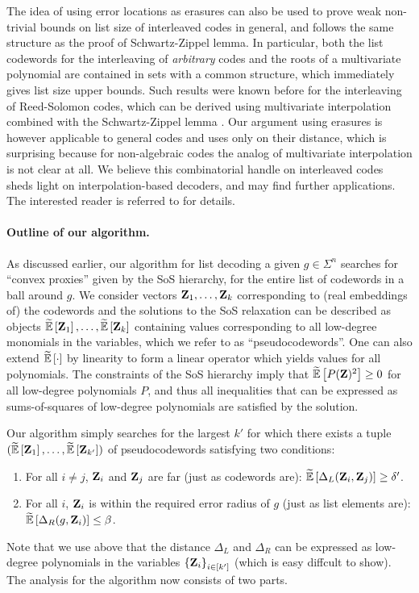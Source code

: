 The idea of using error locations as erasures can also be used to prove weak non-trivial bounds on list size of interleaved codes in general, and follows the same structure as the proof of Schwartz-Zippel lemma. In particular, both the list codewords for the interleaving of \emph{arbitrary} codes and the roots of a multivariate polynomial are contained in sets with a common structure, which immediately gives list size upper bounds. Such results were known before for the interleaving of Reed-Solomon codes, which can be derived using multivariate interpolation combined with the Schwartz-Zippel lemma \cite{CS03, PV05, GX13}. Our argument using erasures is however applicable to general codes and uses only on their distance, which is surprising because for non-algebraic codes the analog of multivariate interpolation is not clear at all. We believe this combinatorial handle on interleaved codes sheds light on interpolation-based decoders, and may find further applications. The interested reader is referred to \cite{Sri24:thesis} for details.

\vspace{-5 pt}
\paragraph{Outline of our algorithm.}
%
As discussed earlier, our algorithm for list decoding a given $g \in \Sigma^n$ searches for ``convex
proxies'' given by the SoS hierarchy, for the entire list of codewords in a ball around $g$.
%
We consider vectors ${ \mathbf{Z} }_1, \ldots, { \mathbf{Z} }_k$ corresponding to (real embeddings of) the codewords
and the solutions to the SoS relaxation can be described as objects $\tildeEx{\zee_1}, \ldots,
\tildeEx{\zee_k}$ containing values corresponding to all low-degree monomials in the variables,
which we refer to as ``pseudocodewords''.
%
One can also extend $\tildeEx{\cdot}$ by linearity to form a linear operator which yields values for
all polynomials. The constraints of the SoS hierarchy imply that $\tildeEx{P(\zee)^2} \geq 0$ for all
low-degree polynomials $P$, and thus all inequalities that can be expressed as sums-of-squares of
low-degree polynomials are satisfied by the solution.

Our algorithm simply searches for the largest $k'$ for which there exists a tuple $(\tildeEx{\zee_1}, \ldots,
\tildeEx{\zee_{k'}})$ of pseudocodewords satisfying two conditions:
%
\begin{enumerate}
\item For all $i \neq j$, ${ \mathbf{Z} }_i$ and ${ \mathbf{Z} }_j$ are far (just as codewords are):
  $\tildeEx{\Delta_L(\zee_i, \zee_j)} \geq \delta'$.
\item For all $i$, ${ \mathbf{Z} }_i$ is within the required error radius of $g$ (just as list elements are):
  $\tildeEx{\Delta_R(g,\zee_i)} \leq \beta$.
\end{enumerate}
%
Note that we use above that the distance $\Delta_L$ and $\Delta_R$ can be expressed as low-degree
polynomials in the variables $\left\{{ \mathbf{Z} }_i\right\}_{i \in [k']}$ (which is easy diffcult to show).
%
The analysis for the algorithm now consists of two parts. 
%

